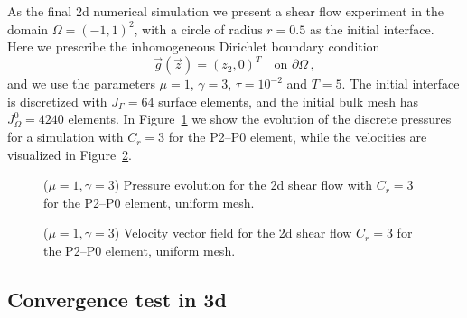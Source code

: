 \documentclass[a4paper,12pt,onecolumn]{article}
\begin{document}
As the final 2d numerical simulation we present a shear flow experiment
in the domain $\Omega=(-1,1)^2$, with a circle of radius $r=0.5$ as the 
initial interface. Here we 
prescribe the inhomogeneous Dirichlet boundary condition
\begin{equation*}
\vec g(\vec z)=(z_2,0)^T\quad \mbox{on }\partial\Omega\,,
\end{equation*}
and we use the parameters $\mu=1$, $\gamma=3$, $\tau=10^{-2}$ and $T=5$. 
The initial interface is discretized with $J_\Gamma = 64$ surface elements, 
and the initial bulk mesh has $J_\Omega^0 = 4240$ elements.
In Figure~\ref{fig:shear_2d} we show the evolution of the discrete pressures
for a simulation with $C_r=3$ for the P2--P0 element, while the velocities
are visualized in Figure~\ref{fig:shear_2d_velocity}.
\begin{figure}[htbp]
  \centering
  \caption{($\mu=1,\gamma=3$) Pressure evolution for the 2d shear flow with $C_r=3$ for the P2--P0 element, uniform mesh.}
  \label{fig:shear_2d}
\end{figure}

\begin{figure}[htbp]
  \centering
  \caption{($\mu=1,\gamma=3$) Velocity vector field for the 2d shear flow 
$C_r=3$ for the P2--P0 element, uniform mesh.}
  \label{fig:shear_2d_velocity}
\end{figure}

\subsection{Convergence test in 3d} \label{sec:45}
\end{document}
